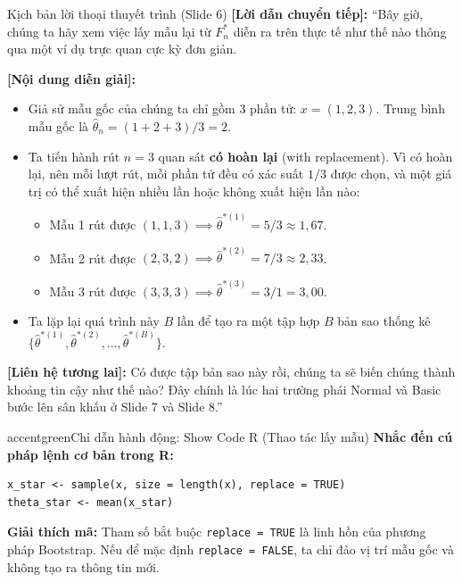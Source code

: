 \documentclass[10pt,a4paper]{article}
\begin{document}
\begin{scriptbox}{Kịch bản lời thoại thuyết trình (Slide 6)}
    \textbf{[Lời dẫn chuyển tiếp]:} ``Bây giờ, chúng ta hãy xem việc lấy mẫu lại từ $F_n^*$ diễn ra trên thực tế như thế nào thông qua một ví dụ trực quan cực kỳ đơn giản.
    
    \textbf{[Nội dung diễn giải]:} 
    \begin{itemize}
        \item Giả sử mẫu gốc của chúng ta chỉ gồm 3 phần tử: $x = (1, 2, 3)$. Trung bình mẫu gốc là $\hat\theta_n = (1+2+3)/3 = 2$.
        \item Ta tiến hành rút $n=3$ quan sát \textbf{có hoàn lại} (with replacement). Vì có hoàn lại, nên mỗi lượt rút, mỗi phần tử đều có xác suất $1/3$ được chọn, và một giá trị có thể xuất hiện nhiều lần hoặc không xuất hiện lần nào:
        \begin{itemize}
            \item Mẫu 1 rút được $(1, 1, 3) \implies \hat\theta^{*(1)} = 5/3 \approx 1{,}67$.
            \item Mẫu 2 rút được $(2, 3, 2) \implies \hat\theta^{*(2)} = 7/3 \approx 2{,}33$.
            \item Mẫu 3 rút được $(3, 3, 3) \implies \hat\theta^{*(3)} = 3/1 = 3{,}00$.
        \end{itemize}
        \item Ta lặp lại quá trình này $B$ lần để tạo ra một tập hợp $B$ bản sao thống kê $\{\hat\theta^{*(1)}, \hat\theta^{*(2)}, \ldots, \hat\theta^{*(B)}\}$.
    \end{itemize}
    \textbf{[Liên hệ tương lai]:} Có được tập bản sao này rồi, chúng ta sẽ biến chúng thành khoảng tin cậy như thế nào? Đây chính là lúc hai trường phái Normal và Basic bước lên sân khấu ở Slide 7 và Slide 8.''
\end{scriptbox}

\begin{actionbox}{accentgreen}{Chỉ dẫn hành động: Show Code R (Thao tác lấy mẫu)}
    \textbf{Nhắc đến cú pháp lệnh cơ bản trong R:}
\begin{verbatim}
x_star <- sample(x, size = length(x), replace = TRUE)
theta_star <- mean(x_star)
\end{verbatim}
    \textbf{Giải thích mã:} Tham số bắt buộc \texttt{replace = TRUE} là linh hồn của phương pháp Bootstrap. Nếu để mặc định \texttt{replace = FALSE}, ta chỉ đảo vị trí mẫu gốc và không tạo ra thông tin mới.
\end{actionbox}
\end{document}
